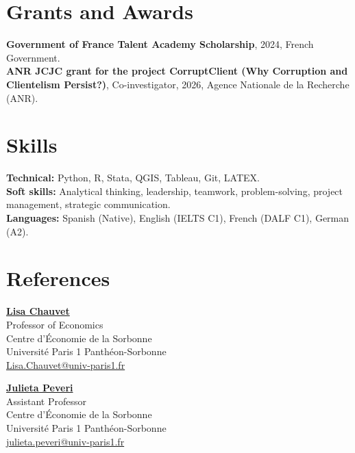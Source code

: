 \documentclass[10pt,a4paper]{article}
\begin{document}
\section{Grants and Awards}
\textbf{Government of France Talent Academy Scholarship}, 2024, French Government. \\
\textbf{ANR JCJC grant for the project CorruptClient (Why Corruption and Clientelism Persist?)}, Co-investigator, 2026, Agence Nationale de la Recherche (ANR). 


\section{Skills}
\textbf{Technical:} Python, R, Stata, QGIS, Tableau, Git, LATEX.\\
\textbf{Soft skills:} Analytical thinking, leadership, teamwork, problem-solving, project management, strategic communication.\\
\textbf{Languages:} Spanish (Native), English (IELTS C1), French (DALF C1), German (A2).

\section{References}
\begin{minipage}[t]{0.48\textwidth}
\textbf{\href{https://sites.google.com/site/lisachauvetdial/home}{Lisa Chauvet}}\\
Professor of Economics\\
Centre d'Économie de la Sorbonne\\
Université Paris 1 Panthéon-Sorbonne\\
\href{mailto:Lisa.Chauvet@univ-paris1.fr}{Lisa.Chauvet@univ-paris1.fr}
\end{minipage}\hfill
\begin{minipage}[t]{0.48\textwidth}
\textbf{\href{https://sites.google.com/view/julietapeveri}{Julieta Peveri}}\\
Assistant Professor\\
Centre d'Économie de la Sorbonne\\
Université Paris 1 Panthéon-Sorbonne\\
\href{mailto:julieta.peveri@univ-paris1.fr}{julieta.peveri@univ-paris1.fr}
\end{minipage}
\end{document}
